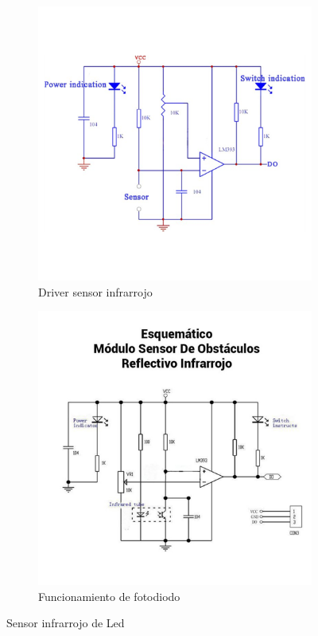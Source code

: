 \documentclass[a4paper,11pt]{report}    %
\begin{document}
\begin{figure}[H]
    \begin{subfigure}[t]{0.475\textwidth}
        \includegraphics[width=1\textwidth]{img/image9.png}
        \caption{Driver sensor infrarrojo}
        \label{subfig:example-image-b}
    \end{subfigure}%
    \hfill
    \begin{subfigure}[t]{0.475\textwidth}
        \includegraphics[width=1\textwidth]{img/image10.png}
        \caption{Funcionamiento de fotodiodo}
        \label{subfig:example-image-c}
    \end{subfigure}
    \caption{Sensor infrarrojo de Led}
    \label{fig:test_subfigure}
\end{figure}
\end{document}
